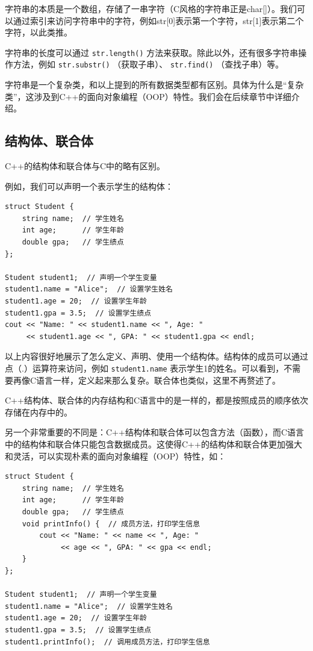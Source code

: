 字符串的本质是一个数组，存储了一串字符（C风格的字符串正是char[]）。我们可以通过索引来访问字符串中的字符，例如str[0]表示第一个字符，str[1]表示第二个字符，以此类推。

字符串的长度可以通过 \texttt{str.length()} 方法来获取。除此以外，还有很多字符串操作方法，例如 \texttt{str.substr()} （获取子串）、 \texttt{str.find()} （查找子串）等。

字符串是一个复杂类，和以上提到的所有数据类型都有区别。具体为什么是“复杂类”，这涉及到C++的面向对象编程（OOP）特性。我们会在后续章节中详细介绍。

\subsection{结构体、联合体}
C++的结构体和联合体与C中的略有区别。

例如，我们可以声明一个表示学生的结构体：
\begin{verbatim}
struct Student {
    string name;  // 学生姓名
    int age;      // 学生年龄
    double gpa;   // 学生绩点
};

Student student1;  // 声明一个学生变量
student1.name = "Alice";  // 设置学生姓名
student1.age = 20;  // 设置学生年龄
student1.gpa = 3.5;  // 设置学生绩点
cout << "Name: " << student1.name << ", Age: "
     << student1.age << ", GPA: " << student1.gpa << endl;
\end{verbatim}

以上内容很好地展示了怎么定义、声明、使用一个结构体。结构体的成员可以通过点（.）运算符来访问，例如 \texttt{student1.name} 表示学生1的姓名。可以看到，不需要再像C语言一样，定义起来那么复杂。联合体也类似，这里不再赘述了。

C++结构体、联合体的内存结构和C语言中的是一样的，都是按照成员的顺序依次存储在内存中的。

另一个非常重要的不同是：C++结构体和联合体可以包含方法（函数），而C语言中的结构体和联合体只能包含数据成员。这使得C++的结构体和联合体更加强大和灵活，可以实现朴素的面向对象编程（OOP）特性，如：
\begin{verbatim}
struct Student {
    string name;  // 学生姓名
    int age;      // 学生年龄
    double gpa;   // 学生绩点
    void printInfo() {  // 成员方法，打印学生信息
        cout << "Name: " << name << ", Age: "
             << age << ", GPA: " << gpa << endl;
    }
};

Student student1;  // 声明一个学生变量
student1.name = "Alice";  // 设置学生姓名
student1.age = 20;  // 设置学生年龄
student1.gpa = 3.5;  // 设置学生绩点
student1.printInfo();  // 调用成员方法，打印学生信息
\end{verbatim}

